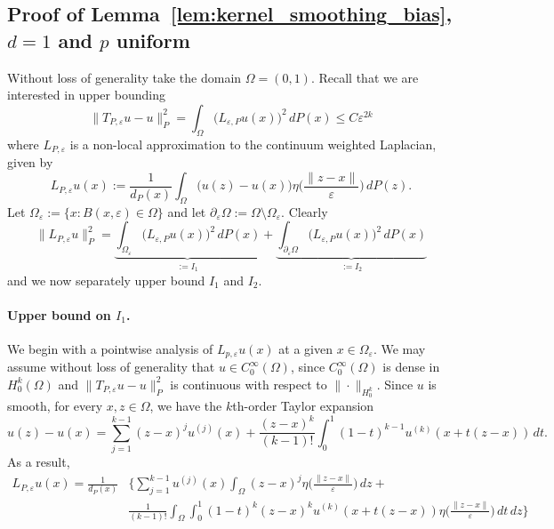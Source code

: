 \documentclass{article}
\newcommand{\1}{\mathbf{1}}
\theoremstyle{definition}
\theoremstyle{remark}
\begin{document}
\subsection{Proof of Lemma~\ref{lem:kernel_smoothing_bias}, $d = 1$ and $p$ uniform}
\label{subsec:kernel_smoothing_bias_pf_1d_uniform_p}
Without loss of generality take the domain $\Omega = (0,1)$. Recall that we are interested in upper bounding
\begin{equation*}
\|T_{P,\varepsilon}u - u\|_{P}^2 = \int_{\Omega} \bigl(L_{\varepsilon,P}u(x)\bigr)^2 \,dP(x) \leq C\varepsilon^{2k}
\end{equation*}
where $L_{P,\varepsilon}$ is a non-local approximation to the continuum weighted Laplacian, given by
\begin{equation*}
L_{P,\varepsilon}u(x) := \frac{1}{d_P(x)}\int_{\Omega} \bigl(u(z) - u(x)\bigr) \eta\biggl(\frac{\|z - x\|}{\varepsilon}\biggr) \,dP(z).
\end{equation*}
Let $\Omega_{\varepsilon} := \{x: B(x,\varepsilon) \in \Omega\}$ and let $\partial_{\varepsilon}\Omega := \Omega \setminus \Omega_{\varepsilon}$. Clearly
\begin{equation*}
\|L_{P,\varepsilon}u\|_{P}^2 = \underbrace{\int_{\Omega_{\varepsilon}} \bigl(L_{\varepsilon,P}u(x)\bigr)^2 \,dP(x)}_{:=I_1} + \underbrace{\int_{\partial_{\varepsilon}\Omega} \bigl(L_{\varepsilon,P}u(x)\bigr)^2 \,dP(x)}_{:=I_2}
\end{equation*}
and we now separately upper bound $I_1$ and $I_2$.

\paragraph{Upper bound on $I_1$.}
We begin with a pointwise analysis of $L_{p,\varepsilon}u(x)$ at a given $x \in \Omega_{\varepsilon}$. We may assume without loss of generality that $u \in C_0^{\infty}(\Omega)$, since $C_0^{\infty}(\Omega)$ is dense in $H_0^k(\Omega)$ and $\|T_{P,\varepsilon}u - u\|_P^2$ is continuous with respect to $\|\cdot\|_{H_0^k}$. Since $u$ is smooth, for every $x,z \in \Omega$, we have the $k$th-order Taylor expansion
\begin{equation*}
u(z) - u(x) = \sum_{j = 1}^{k - 1} (z - x)^{j} u^{(j)}(x)  + \frac{(z - x)^k}{(k - 1)!}\int_{0}^{1}(1 - t)^{k - 1}u^{(k)}(x + t(z - x))\,dt.
\end{equation*}
As a result,
\begin{equation}
\label{pf:kernel_smoothing_bias_1d_1}
\begin{aligned}
L_{P,\varepsilon}u(x) = \frac{1}{d_P(x)} & \Biggl\{\sum_{j = 1}^{k - 1} u^{(j)}(x) \int_{\Omega}(z - x)^{j}\eta\biggl(\frac{\|z - x\|}{\varepsilon}\biggr)\,dz + \\ 
& \frac{1}{(k - 1)!} \int_{\Omega} \int_{0}^{1} (1 - t)^k (z - x)^k u^{(k)}(x + t(z - x)) \eta\biggl(\frac{\|z - x\|}{\varepsilon}\biggr) \,dt \,dz \Biggr\}
\end{aligned}
\end{equation} 
\end{document}

